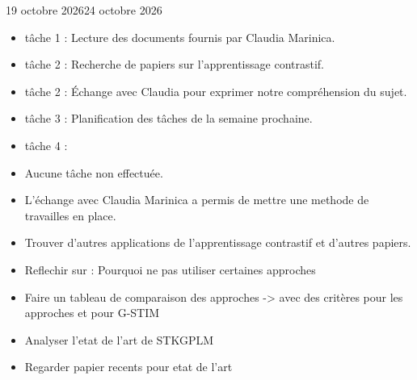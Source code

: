 \documentclass[12pt]{fiche-rd-info}
\begin{document}

\begin{fichesuivi}{19 octobre 2026}{24 octobre 2026}

	\begin{travaileffectue}
		\begin{itemize}
			\item tâche 1 : Lecture des documents fournis par Claudia Marinica.
			\item tâche 2 : Recherche de papiers sur l'apprentissage contrastif.
			\item tâche 2 : Échange avec Claudia pour exprimer notre compréhension du sujet.
			\item tâche 3 : Planification des tâches de la semaine prochaine.
			\item tâche 4 : 
		\end{itemize}
	\end{travaileffectue}

	\begin{travailnoneffectue}
		\begin{itemize}
			\item Aucune tâche non effectuée.
		\end{itemize}
	\end{travailnoneffectue}

	\begin{echange}
		\begin{itemize}
			\item L'échange avec Claudia Marinica a permis de mettre une methode de travailles en place.
		\end{itemize}
	\end{echange}

	\begin{planification}
		\begin{itemize}
			\item Trouver d'autres applications de l'apprentissage contrastif et d'autres papiers.
			\item Reflechir sur : Pourquoi ne pas utiliser certaines approches
			\item Faire un tableau de comparaison des approches -> avec des critères pour les approches et pour G-STIM
			\item Analyser l'etat de l'art de STKGPLM
			\item Regarder papier recents pour etat de l'art
		\end{itemize}
	\end{planification}
\end{fichesuivi}
\end{document}
